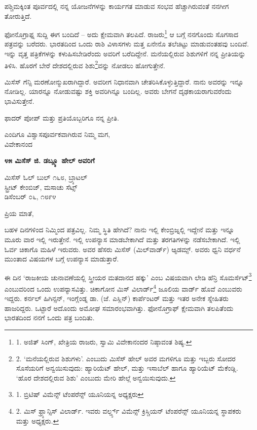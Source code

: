 ಪಶ್ಚಿಮಕ್ಕಿಂತ ಪೂರ್ವದಲ್ಲಿ ನನ್ನ ಯೋಜನೆಗಳನ್ನು ಕಾರ್ಯಗತ ಮಾಡುವ ಸಂಭವ ಹೆಚ್ಚಾಗಿರುವಂತೆ ನನಗೀಗ ತೋರುತ್ತಿದೆ.

ಫೋನೊಗ್ರಾಫ್ನ ಸುದ್ದಿ ಈಗ ಬಂದಿದೆ – ಅದು ಕ್ಷೇಮವಾಗಿ ತಲಪಿದೆ. ರಾಜರು\footnote{1. ಅಜಿತ್ ಸಿಂಗ್, ಖೇತ್ರಿಯ ರಾಜರು, ಸ್ವಾಮಿ ವಿವೇಕಾನಂದರ ನಿಷ್ಠಾವಂತ ಶಿಷ್ಯ.} ಆ ಬಗ್ಗೆ ನನಗೊಂದು ಸೊಗಸಾದ ಪತ್ರವನ್ನು ಬರೆದರು. ಭಾರತದಿಂದ ಒಂದು ರಾಶಿ ವಿಳಾಸಗಳು ಮತ್ತ ಏನೇನೊ ತಲೆಚಿಟ್ಟು ಮಾಡುವಂತಹವು ಬಂದಿವೆ. ಇನ್ನು ವೃತ್ತ ಪತ್ರಿಕೆಗಳನ್ನು ಕಳುಹಿಸಬೇಡಿರೆಂದು ಅವರಿಗೆ ಬರೆದಿದ್ದೇನೆ. ಮನೆಯಲ್ಲಿರುವ ಶಿಶುಗಳಿಗೆ ನನ್ನ ಪ್ರೀತಿಯನ್ನು ತಿಳಿಸಿ. ಹೊರಗೆ ಬೇರೆ ದೇಶದಲ್ಲಿರುವ ಶಿಶು\footnote{2. ‘ಮನೆಯಲ್ಲಿರುವ ಶಿಶುಗಳು’. ಎಂಬುದು ಮಿಸೆಸ್ ಹೇಲ್ ಅವರ ಮಗಳಿಗೂ ಮತ್ತು ಇಬ್ಬರು ಸೋದರ ಸೊಸೆಯರಿಗೆ ಅನ್ವಯಿಸುವುದು: ಹ್ಯಾರಿಯೆಟ್ ಹೇಲ್, ಮತ್ತು ಇಸಾಬೆಲ್ ಹಾಗೂ ಹ್ಯಾರಿಯೆಟ್ ಮೆಕೆಂಡ್ಲಿ. ‘ಹೊರ ದೇಶದಲ್ಲಿರುವ ಶಿಶು’ ಎಂಬುದು ಮೇರಿ ಹೇಲ್ಗೆ ಅನ್ವಯಿಸುವುದು.}ವನ್ನು ನೋಡಲು ಹೋಗುತ್ತೇನೆ.

ಮಿಸೆಸ್ ಗೆನ್ಸಿ ಮರಣೋನ್ಮುಖರಾಗಿದ್ದಾರೆ. ಅವರೀಗ ನಿಧಾನವಾಗಿ ಚೇತರಿಸಿಕೊಳ್ಳುತ್ತಿದ್ದಾರೆ. ನಾನು ಅವರನ್ನು ಇನ್ನೂ ನೋಡಿಲ್ಲ. ಯಾರನ್ನೂ ನೋಡುವಷ್ಟು ಶಕ್ತಿ ಅವರಿಗಿನ್ನೂ ಬಂದಿಲ್ಲ. ಅವರು ಬೇಗನೆ ದೃಢಕಾಯರಾಗುವರೆಂದು ಭಾವಿಸುತ್ತೇನೆ.

ಫಾದರ್ ಪೋಪ್ ಮತ್ತು ಪ್ರತಿಯೊಬ್ಬರಿಗೂ ನನ್ನ ಪ್ರೀತಿ.

\begin{flushright}
ಎಂದಿಗೂ ವಿಶ್ವಾಸಪೂರ್ವಕವಾಗಿರುವ ನಿಮ್ಮ ಮಗ,\\ವಿವೇಕಾನಂದ
\end{flushright}

\begin{center}
\textbf{೪೫ ಮಿಸೆಸ್ ಜಿ. ಡಬ್ಲ್ಯೂ ಹೇಲ್ ಅವರಿಗೆ}
\end{center}

\begin{flushright}
 ಮಿಸೆಸ್ ಓಲ್ ಬುಲ್ ೧೬೮, ಬ್ರ್ಯಾಟಲ್\\ಸ್ಟ್ರೀಟ್ ಕೇಂಬಿಜ್, ಮಸಾಚು ಸೆಟ್ಸ್\\ಡಿಸೆಂಬರ್ ೦೬, ೧೮೯೪
\end{flushright}

ಪ್ರಿಯ ಮಾತೆ,

ಬಹಳ ದಿನಗಳಿಂದ ನಿಮ್ಮಿಂದ ಪತ್ರವಿಲ್ಲ. ನಿಮ್ಮ ಸ್ಥಿತಿ ಹೇಗಿದೆ? ನಾನು ಇಲ್ಲಿ ಕೇಂಬ್ರಿಜ್ನಲ್ಲಿ ಇದ್ದೇನೆ ಮತ್ತು ಇನ್ನೂ ಮೂರು ವಾರ ಇಲ್ಲಿ ಇರುತ್ತೇನೆ. ಇಲ್ಲಿ ಉಪನ್ಯಾಸ ಮಾಡಬೇಕಾಗಿದೆ ಮತ್ತು ತರಗತಿಗಳನ್ನು ನಡೆಸಬೇಕಾಗಿದೆ. ಇಲ್ಲಿ ಓರ್ವ ಚಿಕಾಗೊ ಮಹಿಳೆ ಇರುವರು. ಅವರ ಹೆಸರು ಮಿಸೆಸ್ (ಮಿಲ್​ವಾರ್ಡ್) ಆ್ಯಡಮ್ಸ್. ಅವರು ಧ್ವನಿ ವರ್ಧನೆ ಮುಂತಾದ ವಿಷಯಗಳ ಬಗ್ಗೆ ಉಪನ್ಯಾಸ ಮಾಡುತ್ತಾರೆ.

ಈ ದಿನ ‘ರಾಜಕೀಯ ಚುನಾವಣೆಯಲ್ಲಿ ಸ್ತ್ರೀಯರ ಮತದಾನದ ಹಕ್ಕು’ ಎಂಬ ವಿಷಯವಾಗಿ ಲೇಡಿ ಹೆನ್ರಿ ಸೊಮರ್ಸೆಟ್\footnote{1. ಬ್ರಿಟಿಷ್ ವಿಮೆನ್ಸ್ ಟೆಂಪರೆನ್ಸ್ ಯೂನಿಯನ್ನ ಅಧ್ಯಕ್ಷರು} ಎಂಬುವರಿಂದ ಒಂದು ಉಪನ್ಯಾಸವಿತ್ತು. ಚಿಕಾಗೋನ ಮಿಸ್ ವಿಲಾರ್ಡ್\footnote{2. ಮಿಸ್ ಫ್ರ್ಯಾನ್ಸಿಸ್ ವಿಲಾರ್ಡ್. ಇವರು ವರ್ಲ್ಡ್ಸ್ ವಿಮೆನ್ಸ್ ಕ್ರಿಸ್ಚಿಯನ್ ಟೆಂಪರೆನ್ಸ್ ಯೂನಿಯನ್ನ ಸ್ಥಾಪಕರು ಮತ್ತು ಅಧ್ಯಕ್ಷರು.} ಜೂಲಿಯ ವಾರ್ಡ್ ಹೊವೆ ಎಂಬುವರು ಇದ್ದರು. ಕರ್ನಲ್ ಹಿಗಿನ್ಸನ್, ಇಂಗ್ಲೆಂಡ್ನ ಡಾ. (ಜೆ. ಎಸ್ಲಿನ್) ಕಾರ್ಪೆಂಟರ್ ಮತ್ತು ಇತರ ಅನೇಕ ಸ್ನೇಹಿತರು ಹಾಜರಿದ್ದರು. ಒಟ್ಟಾರೆ ಅದೊಂದು ಅಮೋಘ ಸಮಾರಂಭವಾಗಿತ್ತು. ಫೋನೊಗ್ರಾಫ್ ಕ್ಷೇಮವಾಗಿ ತಲಪಿತೆಂದು ಭಾರತದಿಂದ ನನಗೆ ಒಂದು ಪತ್ರ ಬಂದಿತು.

